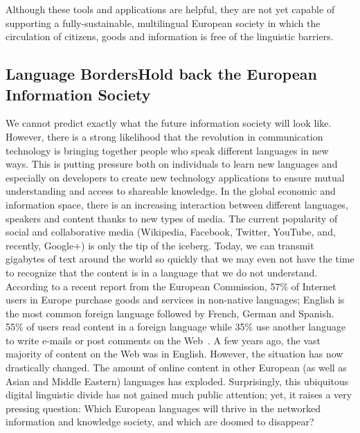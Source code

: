 \begin{multicols}{2}
Although these tools and applications are helpful, they are not yet capable of supporting a fully-sustainable, multilingual European society in which the circulation of citizens, goods and information is free of the linguistic barriers.

\subsection[Language Borders Hold back the European Information Society]{Language Borders\newline Hold back the European Information Society}

We cannot predict exactly what the future information society will look like. However, there is a strong likelihood that the revolution in communication technology is bringing together people who speak different languages in new ways. This is putting pressure both on individuals to learn new languages and especially on developers to create new technology applications to ensure mutual understanding and access to shareable knowledge. In the global economic and information space, there is an increasing interaction between different languages, speakers and content thanks to new types of media. The current popularity of social and collaborative media (Wikipedia, Facebook, Twitter, YouTube, and, recently, Google+) is only the tip of the iceberg.
Today, we can transmit gigabytes of text around the world so quickly that we may even not have the time to recognize that the content is in a language that we do not understand. According to a recent report from the European Commission, 57\% of Internet users in Europe purchase goods and services in non-native languages; English is the most common foreign language followed by French, German and Spanish. 55\% of users read content in a foreign language while 35\% use another language to write e-mails or post comments on the Web~\cite{Eurobarometer313}. A few years ago, the vast majority of content on the Web was in English. However, the situation has now drastically changed. The amount of online content in other European (as well as Asian and Middle Eastern) languages has exploded.
Surprisingly, this ubiquitous digital linguistic divide has not gained much public attention; yet, it raises a very pressing question: Which European languages will thrive in the networked information and knowledge society, and which are doomed to disappear?


\end{multicols}
